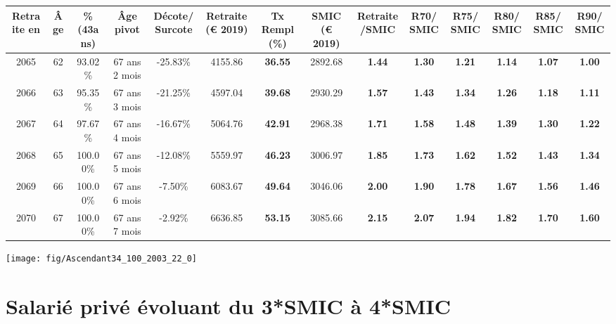 \begin{adjustbox}{max width=\textwidth} 
\begin{tabular}[htb]{|c|c||c|c|c||c|c||c|c||c|c|c|c|c|} 
\hline 
 Retraite en &  Âge &  \%(43ans) &  Âge pivot &  Décote/Surcote &  Retraite (\euro{} 2019) &  Tx Rempl(\%) &  SMIC (\euro{} 2019) &  Retraite/SMIC &  R70/SMIC &  R75/SMIC &  R80/SMIC &  R85/SMIC &  R90/SMIC \\ 
\hline \hline 
 2065 &  62 &  93.02\% &  67 ans 2 mois &  -25.83\% &  4155.86 &  {\bf 36.55} &  2892.68 &  {\bf 1.44} &  {\bf 1.30} &  {\bf 1.21} &  {\bf 1.14} &  {\bf 1.07} &  {\bf 1.00} \\ 
\hline 
 2066 &  63 &  95.35\% &  67 ans 3 mois &  -21.25\% &  4597.04 &  {\bf 39.68} &  2930.29 &  {\bf 1.57} &  {\bf 1.43} &  {\bf 1.34} &  {\bf 1.26} &  {\bf 1.18} &  {\bf 1.11} \\ 
\hline 
 2067 &  64 &  97.67\% &  67 ans 4 mois &  -16.67\% &  5064.76 &  {\bf 42.91} &  2968.38 &  {\bf 1.71} &  {\bf 1.58} &  {\bf 1.48} &  {\bf 1.39} &  {\bf 1.30} &  {\bf 1.22} \\ 
\hline 
 2068 &  65 &  100.00\% &  67 ans 5 mois &  -12.08\% &  5559.97 &  {\bf 46.23} &  3006.97 &  {\bf 1.85} &  {\bf 1.73} &  {\bf 1.62} &  {\bf 1.52} &  {\bf 1.43} &  {\bf 1.34} \\ 
\hline 
 2069 &  66 &  100.00\% &  67 ans 6 mois &  -7.50\% &  6083.67 &  {\bf 49.64} &  3046.06 &  {\bf 2.00} &  {\bf 1.90} &  {\bf 1.78} &  {\bf 1.67} &  {\bf 1.56} &  {\bf 1.46} \\ 
\hline 
 2070 &  67 &  100.00\% &  67 ans 7 mois &  -2.92\% &  6636.85 &  {\bf 53.15} &  3085.66 &  {\bf 2.15} &  {\bf 2.07} &  {\bf 1.94} &  {\bf 1.82} &  {\bf 1.70} &  {\bf 1.60} \\ 
\hline 
\hline 
\end{tabular} 
\end{adjustbox} 
 
 \vspace{0.1cm} 

 {\hspace{-2.2cm}\texttt{[image: fig/Ascendant34\_100\_2003\_22\_0]}} 

\newpage 
 
\chapter{Salarié privé évoluant du 3*SMIC à 4*SMIC} 

~\\ 
 
